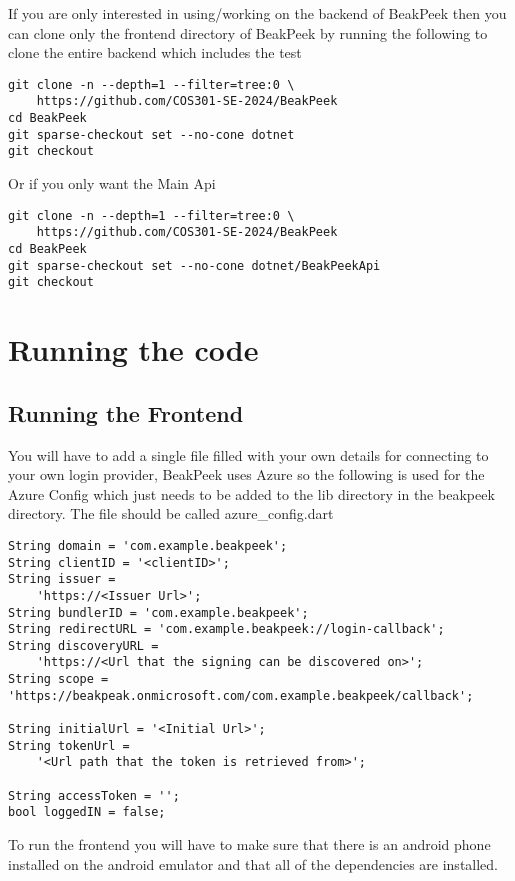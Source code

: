 \documentclass{article}
\begin{document}
If you are only interested in using/working on the backend of BeakPeek then you
can clone only the frontend directory of BeakPeek by running the following to
clone the entire backend which includes the test

\begin{lstlisting}
git clone -n --depth=1 --filter=tree:0 \
    https://github.com/COS301-SE-2024/BeakPeek
cd BeakPeek
git sparse-checkout set --no-cone dotnet
git checkout
\end{lstlisting}

Or if you only want the Main Api

\begin{lstlisting}
git clone -n --depth=1 --filter=tree:0 \
    https://github.com/COS301-SE-2024/BeakPeek
cd BeakPeek
git sparse-checkout set --no-cone dotnet/BeakPeekApi
git checkout
\end{lstlisting}

\section{Running the code}

\subsection{Running the Frontend}

You will have to add a single file filled with your own details for connecting
to your own login provider, BeakPeek uses Azure so the following is used for the
Azure Config which just needs to be added to the lib directory in the beakpeek
directory. The file should be called azure_config.dart

\begin{lstlisting}
String domain = 'com.example.beakpeek';
String clientID = '<clientID>';
String issuer =
    'https://<Issuer Url>';
String bundlerID = 'com.example.beakpeek';
String redirectURL = 'com.example.beakpeek://login-callback';
String discoveryURL =
    'https://<Url that the signing can be discovered on>';
String scope = 'https://beakpeak.onmicrosoft.com/com.example.beakpeek/callback';

String initialUrl = '<Initial Url>';
String tokenUrl =
    '<Url path that the token is retrieved from>';

String accessToken = '';
bool loggedIN = false;
\end{lstlisting}

To run the frontend you will have to make sure that there is an android phone
installed on the android emulator and that all of the dependencies are
installed.
\end{document}
